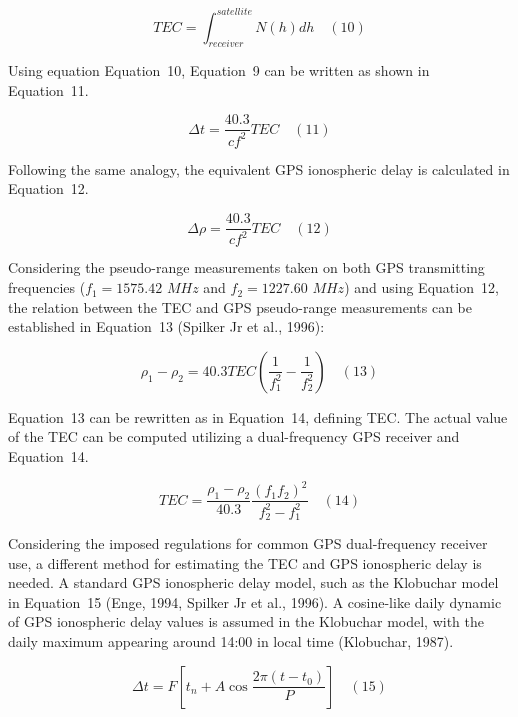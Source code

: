 \documentclass[sn-mathphys-num]{sn-jnl}%
\begin{document}
\begin{equation}
	TEC = \int_{receiver}^{satellite} N(h)dh
	\quad\left(10\right)
\end{equation}

Using equation Equation~10, Equation~9 can be written as shown in Equation~11.

\begin{equation}
	\Delta t = \frac{40.3}{c f^{2}} TEC
	\quad\left(11\right)
\end{equation}

Following the same analogy, the equivalent GPS ionospheric delay is calculated in Equation~12.

\begin{equation}
	\Delta \rho = \frac{40.3}{c f^{2}} TEC
	\quad\left(12\right)
\end{equation}

Considering the pseudo-range measurements taken on both GPS transmitting frequencies ($f_{1}=1575.42$ $MHz$ and $f_{2}=1227.60$ $MHz$) and using Equation~12, the relation between the TEC and GPS pseudo-range measurements can be established in Equation~13 (Spilker Jr et al., 1996):
 
\begin{equation}
	\rho_{1} - \rho_{2} = 40.3 TEC \left( \frac{1}{f_{1}^{2}} - \frac{1}{f_{2}^{2}} \right)
	\quad\left(13\right)
\end{equation}

Equation~13 can be rewritten as in Equation~14, defining TEC. The actual value of the TEC can be computed utilizing a dual-frequency GPS receiver and Equation~14.

\begin{equation}
	TEC = \frac{\rho_{1} - \rho_{2}}{40.3} \frac{{\left(f_{1}f_{2}\right)}^{2}}{f_{2}^{2}-f_{1}^{2}}
	\quad\left(14\right)
\end{equation}

Considering the imposed regulations for common GPS dual-frequency receiver use, a different method for estimating the TEC and GPS ionospheric delay is needed. A standard GPS ionospheric delay model, such as the Klobuchar model in Equation~15 (Enge, 1994, Spilker Jr et al., 1996). A cosine-like daily dynamic of GPS ionospheric delay values is assumed in the Klobuchar model, with the daily maximum appearing around 14:00 in local time (Klobuchar, 1987).

\begin{equation}
	\Delta t = F \left[ t_{n} + A \cos \frac{2\pi\left(t-t_{0}\right)}{P} \right]
	\quad\left(15\right)
\end{equation}
\end{document}
